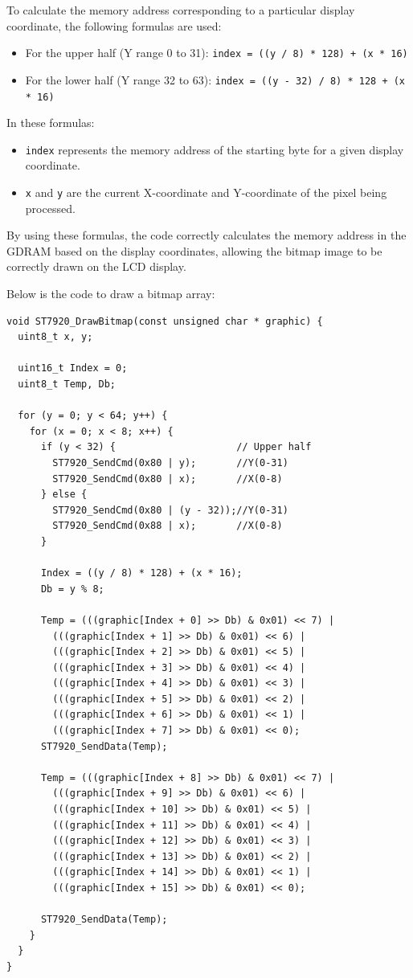 \documentclass[a4paper, twoside]{report}
\begin{document}
To calculate the memory address corresponding to a particular display coordinate, the following formulas are used:
\begin{itemize}
    \item For the upper half (Y range 0 to 31): \texttt{index = ((y / 8) * 128) + (x * 16)}
    \item For the lower half (Y range 32 to 63): \texttt{index = ((y - 32) / 8) * 128 + (x * 16)}
\end{itemize}

In these formulas:
\begin{itemize}
    \item \texttt{index} represents the memory address of the starting byte for a given display coordinate.
    \item \texttt{x} and \texttt{y} are the current X-coordinate and Y-coordinate of the pixel being processed.
\end{itemize}

By using these formulas, the code correctly calculates the memory address in the GDRAM based on the display coordinates, allowing the bitmap image to be correctly drawn on the LCD display.

Below is the code to draw a bitmap array:
\begin{verbatim}
void ST7920_DrawBitmap(const unsigned char * graphic) {
  uint8_t x, y;

  uint16_t Index = 0;
  uint8_t Temp, Db;

  for (y = 0; y < 64; y++) {
    for (x = 0; x < 8; x++) {
      if (y < 32) {                     // Upper half
        ST7920_SendCmd(0x80 | y);       //Y(0-31)
        ST7920_SendCmd(0x80 | x);       //X(0-8)
      } else {
        ST7920_SendCmd(0x80 | (y - 32));//Y(0-31)
        ST7920_SendCmd(0x88 | x);       //X(0-8)
      }

      Index = ((y / 8) * 128) + (x * 16);
      Db = y % 8;

      Temp = (((graphic[Index + 0] >> Db) & 0x01) << 7) |
        (((graphic[Index + 1] >> Db) & 0x01) << 6) |
        (((graphic[Index + 2] >> Db) & 0x01) << 5) |
        (((graphic[Index + 3] >> Db) & 0x01) << 4) |
        (((graphic[Index + 4] >> Db) & 0x01) << 3) |
        (((graphic[Index + 5] >> Db) & 0x01) << 2) |
        (((graphic[Index + 6] >> Db) & 0x01) << 1) |
        (((graphic[Index + 7] >> Db) & 0x01) << 0);
      ST7920_SendData(Temp);

      Temp = (((graphic[Index + 8] >> Db) & 0x01) << 7) |
        (((graphic[Index + 9] >> Db) & 0x01) << 6) |
        (((graphic[Index + 10] >> Db) & 0x01) << 5) |
        (((graphic[Index + 11] >> Db) & 0x01) << 4) |
        (((graphic[Index + 12] >> Db) & 0x01) << 3) |
        (((graphic[Index + 13] >> Db) & 0x01) << 2) |
        (((graphic[Index + 14] >> Db) & 0x01) << 1) |
        (((graphic[Index + 15] >> Db) & 0x01) << 0);

      ST7920_SendData(Temp);
    }
  }
}
\end{verbatim}
\end{document}
